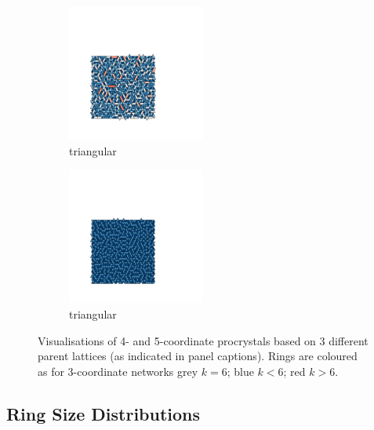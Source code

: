 \begin{figure}[bt]
	\vspace{0.5cm}          
     \begin{subfigure}[b]{0.45\textwidth}
         \centering
         \includegraphics[height=4.5cm]{./figures/procrystals/pro_tri4.pdf}
         \caption{triangular}
         \label{fig:pro45c}
     \end{subfigure}
     \hfill     
     \begin{subfigure}[b]{0.45\textwidth}
         \centering
         \includegraphics[height=4.5cm]{./figures/procrystals/pro_tri5.pdf}
         \caption{triangular}
         \label{fig:pro45d}
     \end{subfigure}
    
     \caption{Visualisations of 4\-- and 5\--coordinate procrystals based on 3 different parent lattices (as indicated in panel captions). Rings are coloured as for 3\--coordinate networks \ie grey $k=6$; blue $k<6$; red $k>6$.}
     \label{fig:pro45}
\end{figure}

\subsection{Ring Size Distributions}


